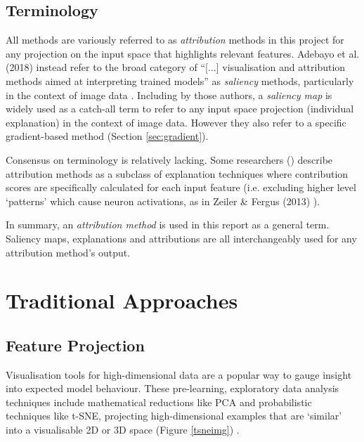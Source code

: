 \documentclass[main]{subfiles}
\begin{document}
\subsection*{Terminology}
All methods are variously referred to as \textit{attribution} methods in this project for any projection on the input space that highlights relevant features. Adebayo et al. (2018) instead refer to the broad category of ``[...] visualisation and attribution methods aimed at interpreting trained models'' as \textit{saliency} methods, particularly in the context of image data \cite{sanity}. Including by those authors, a \textit{saliency map} is widely used as a catch-all term to refer to any input space projection (individual explanation) in the context of image data. However they also refer to a specific gradient-based method (Section \ref{sec:gradient}). 

Consensus on terminology is relatively lacking. Some researchers (\cite{patternnet}) describe attribution methods as a subclass of explanation techniques where contribution scores are specifically calculated for each input feature (i.e. excluding higher level `patterns' which cause neuron activations, as in Zeiler \& Fergus (2013) \cite{zeilerfergus2013}).

In summary, an \textit{attribution method} is used in this report as a general term. Saliency maps, explanations and attributions are all interchangeably used for any attribution method's output.


\section{Traditional Approaches}

\subsection{Feature Projection}
Visualisation tools for high-dimensional data are a popular way to gauge insight into expected model behaviour.  These pre-learning, exploratory data analysis techniques include mathematical reductions like PCA and probabilistic techniques like t-SNE,  projecting high-dimensional examples that are `similar' into a visualisable 2D or 3D space (Figure \ref{tsneimg}) \cite{tsnepaper} .
\end{document}
